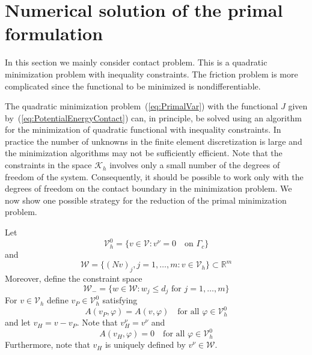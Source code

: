 \documentclass[12pt,a4paper]{article}
\numberwithin{equation}{section}
\numberwithin{table}{section}
\numberwithin{figure}{section}
\newcommand{\R}{\ensuremath{\mathbb{R}}}
\newcommand{\Rm}{\ensuremath{\R^m}}
\newcommand{\W}{\ensuremath{\mathcal{W}}}
\newcommand{\V}{\ensuremath{\mathcal{V}}}
\newcommand{\K}{\ensuremath{\mathcal{K}}}
\newcommand{\Kh}{\ensuremath{\K_h}}
\newcommand{\Vh}{{\mathcal V}_h}
\renewcommand{\phi}{\varphi}
\newcommand{\qforall}{\quad\text{for all }}
\begin{document}
\section{Numerical solution of the primal formulation}
\label{sec:numer-solut-prim}

In this section we mainly consider contact problem. This is a quadratic minimization
problem with inequality constraints.  The friction problem is more complicated since the
functional to be minimized is nondifferentiable.

The quadratic minimization problem~(\ref{eq:PrimalVar}) with the functional $J$ given
by~(\ref{eq:PotentialEnergyContact}) can, in principle, be solved using an algorithm for
the minimization of quadratic functional with inequality constraints.  In practice the
number of unknowns in the finite element discretization is large and the minimization
algorithms may not be sufficiently efficient.  Note that the constraints in the space $\Kh$
involves only a small number of the degrees of freedom of the system.  Consequently, it
should be possible to work only with the degrees of freedom on the contact boundary in the
minimization problem.  We now show one possible strategy for the reduction of the
primal minimization problem.

Let
\begin{equation}
  \label{eq:31}
  \Vh^0 = \{ v\in \V \colon v^\nu = 0\quad\text{on }\Gamma_c \}
\end{equation}
and 
\begin{equation}
  \label{eq:32}
  \W = \{ (Nv)_j,j=1,\dotsc,m \colon v\in \Vh\} \subset \Rm
\end{equation}
Moreover, define the constraint space
\begin{equation}
  \label{eq:38}
  \W_{-} = \{ w\in \W \colon w_j\le d_j \text{ for }j=1,\dotsc,m \}
\end{equation}
For $v\in\Vh$ define $v_P \in \Vh^0$ satisfying
\begin{equation}
  \label{eq:34}
  A(v_P, \phi) = A(v, \phi) \qforall \phi\in\Vh^0
\end{equation}
and let $v_H=v-v_P$.  Note that $v_H^\nu = v^\nu$ and
\begin{equation}
  \label{eq:39}
  A(v_H,\phi)=0 \qforall \phi\in\Vh^0
\end{equation}
Furthermore, note that $v_H$ is uniquely defined by $v^\nu\in \W$.
\end{document}
